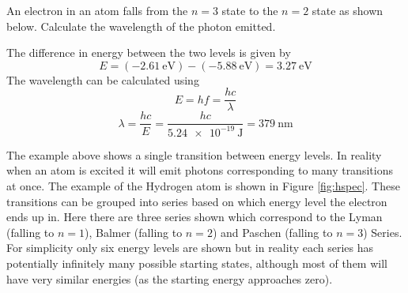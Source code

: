 \documentclass[main.tex]{subfiles}
\begin{document}
\begin{example}
  An electron in an atom falls from the $n=3$ state to the $n=2$ state as shown below. Calculate the wavelength of the photon emitted.
  \begin{center}
  \end{center}

  \answer
  The difference in energy between the two levels is given by
  \[ E = \left(\SI{-2.61}{\electronvolt}\right) - \left(\SI{-5.88}{\electronvolt}\right) = \SI{3.27}{\electronvolt} \]
  The wavelength can be calculated using
  \[ E = hf = \frac{hc}{\lambda} \]
  \[ \lambda = \frac{hc}{E} = \frac{hc}{\SI{5.24e-19}{\joule}} = \SI{379}{\nano\meter} \]
\end{example}


The example above shows a single transition between energy levels. In reality when an atom is excited it will emit photons corresponding to many transitions at once. The example of the Hydrogen atom is shown in Figure \ref{fig:hspec}. These transitions can be grouped into series based on which energy level the electron ends up in. Here there are three series shown which correspond to the Lyman (falling to $n=1$), Balmer (falling to $n=2$) and Paschen (falling to $n=3$) Series. For simplicity only six energy levels are shown but in reality each series has potentially infinitely many possible starting states, although most of them will have very similar energies (as the starting energy approaches zero).
\end{document}
